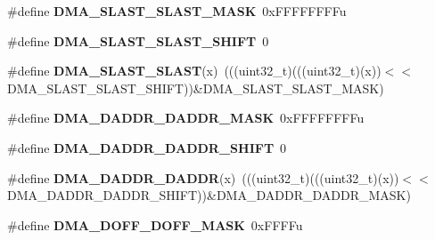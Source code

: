 \begin{DoxyCompactItemize}
\item 
\#define {\bfseries D\+M\+A\+\_\+\+S\+L\+A\+S\+T\+\_\+\+S\+L\+A\+S\+T\+\_\+\+M\+A\+SK}~0x\+F\+F\+F\+F\+F\+F\+F\+Fu\hypertarget{group__DMA__Register__Masks_ga5bf83d5a89fb81000526efccd2390490}{}\label{group__DMA__Register__Masks_ga5bf83d5a89fb81000526efccd2390490}

\item 
\#define {\bfseries D\+M\+A\+\_\+\+S\+L\+A\+S\+T\+\_\+\+S\+L\+A\+S\+T\+\_\+\+S\+H\+I\+FT}~0\hypertarget{group__DMA__Register__Masks_ga3cfd6e1dd2ee3e538fe847f51c51e9e9}{}\label{group__DMA__Register__Masks_ga3cfd6e1dd2ee3e538fe847f51c51e9e9}

\item 
\#define {\bfseries D\+M\+A\+\_\+\+S\+L\+A\+S\+T\+\_\+\+S\+L\+A\+ST}(x)~(((uint32\+\_\+t)(((uint32\+\_\+t)(x))$<$$<$D\+M\+A\+\_\+\+S\+L\+A\+S\+T\+\_\+\+S\+L\+A\+S\+T\+\_\+\+S\+H\+I\+FT))\&D\+M\+A\+\_\+\+S\+L\+A\+S\+T\+\_\+\+S\+L\+A\+S\+T\+\_\+\+M\+A\+SK)\hypertarget{group__DMA__Register__Masks_gaaf7074ad8d4f6d4e0787cdd621f34212}{}\label{group__DMA__Register__Masks_gaaf7074ad8d4f6d4e0787cdd621f34212}

\item 
\#define {\bfseries D\+M\+A\+\_\+\+D\+A\+D\+D\+R\+\_\+\+D\+A\+D\+D\+R\+\_\+\+M\+A\+SK}~0x\+F\+F\+F\+F\+F\+F\+F\+Fu\hypertarget{group__DMA__Register__Masks_ga48e5c0ccc5f7c71ee28906182a7ff94c}{}\label{group__DMA__Register__Masks_ga48e5c0ccc5f7c71ee28906182a7ff94c}

\item 
\#define {\bfseries D\+M\+A\+\_\+\+D\+A\+D\+D\+R\+\_\+\+D\+A\+D\+D\+R\+\_\+\+S\+H\+I\+FT}~0\hypertarget{group__DMA__Register__Masks_ga807c49b547c5b45c106ddc9f99a791c3}{}\label{group__DMA__Register__Masks_ga807c49b547c5b45c106ddc9f99a791c3}

\item 
\#define {\bfseries D\+M\+A\+\_\+\+D\+A\+D\+D\+R\+\_\+\+D\+A\+D\+DR}(x)~(((uint32\+\_\+t)(((uint32\+\_\+t)(x))$<$$<$D\+M\+A\+\_\+\+D\+A\+D\+D\+R\+\_\+\+D\+A\+D\+D\+R\+\_\+\+S\+H\+I\+FT))\&D\+M\+A\+\_\+\+D\+A\+D\+D\+R\+\_\+\+D\+A\+D\+D\+R\+\_\+\+M\+A\+SK)\hypertarget{group__DMA__Register__Masks_gaa5ee85425c606207db16f18c9d16320d}{}\label{group__DMA__Register__Masks_gaa5ee85425c606207db16f18c9d16320d}

\item 
\#define {\bfseries D\+M\+A\+\_\+\+D\+O\+F\+F\+\_\+\+D\+O\+F\+F\+\_\+\+M\+A\+SK}~0x\+F\+F\+F\+Fu\hypertarget{group__DMA__Register__Masks_gac1132370cf369d1591e78a45fca94abc}{}\label{group__DMA__Register__Masks_gac1132370cf369d1591e78a45fca94abc}


\end{DoxyCompactItemize}

